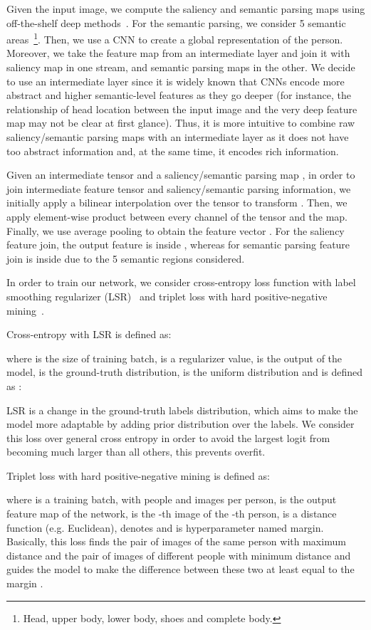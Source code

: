 \documentclass[final,3p,times,twocolumn]{elsarticle}
\begin{document}
Given the input image, we compute the saliency and semantic parsing maps using off-the-shelf deep methods~\cite{li2016deepsaliency,Gong_2017_CVPR}. For the semantic parsing, we consider 5 semantic areas~\footnote{Head, upper body, lower body, shoes and complete body.}. Then, we use a CNN to create a global representation of the person. Moreover, we take the feature map from an intermediate layer and join it with saliency map in one stream, and semantic parsing maps in the other. We decide to use an intermediate layer since it is widely known that CNNs encode more abstract and higher semantic-level features as they go deeper (for instance, the relationship of head location between the input image and the very deep feature map may not be clear at first glance). Thus, it is more intuitive to combine raw saliency/semantic parsing maps with an intermediate layer as it does not have too abstract information and, at the same time, it encodes rich information.

Given an intermediate tensor  and a saliency/semantic parsing map , in order to join intermediate feature tensor and saliency/semantic parsing information, we initially apply a bilinear interpolation over the tensor to transform . Then, we apply element-wise product between every channel of the tensor and the map. Finally, we use average pooling to obtain the feature vector . For the saliency feature join, the output feature is inside , whereas for semantic parsing feature join is inside  due to the 5 semantic regions considered.

In order to train our network, we consider cross-entropy loss function with label smoothing regularizer (LSR)~\cite{szegedy2016rethinking} and triplet loss with hard positive-negative mining~\cite{hermans2017defense}.

Cross-entropy with LSR is defined as:

\noindent where  is the size of training batch,  is a regularizer value,  is the output of the model,  is the ground-truth distribution,  is the uniform distribution and  is defined as :


LSR is a change in the ground-truth labels distribution, which aims to make the model more adaptable by adding prior distribution over the labels. We consider this loss over general cross entropy in order to avoid the largest logit from becoming much larger than all others, this prevents overfit.

Triplet loss with hard positive-negative mining is defined as:

\noindent where  is a training batch, with  people and  images per person,  is the output feature map of the network,  is the -th image of the -th person,  is a distance function (e.g. Euclidean),  denotes  and  is hyperparameter named margin. Basically, this loss finds the pair of images of the same person with maximum distance and the pair of images of different people with minimum distance and guides the model to make the difference between these two at least equal to the margin .
\end{document}
